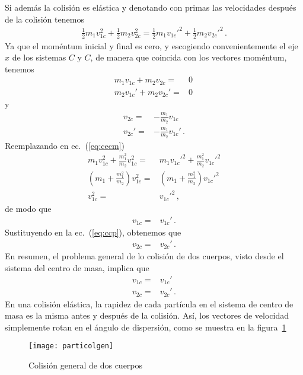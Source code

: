 Si además la colisión es elástica y denotando con primas las
velocidades después de la colisión tenemos
\begin{align}
\label{eq:cecm}
  \tfrac{1}{2}m_1 v_{1c}^2+  \tfrac{1}{2}m_2 v_{2c}^2
= \tfrac{1}{2}m_1 {v_{1c}'}^2+ \tfrac{1}{2}m_2 {v_{2c}'}^2\,.
\end{align}
Ya que el moméntum inicial y final es cero, y escogiendo
convenientemente el eje $x$ de los sistemas $C$ y $C$, de manera que
coincida con los vectores moméntum, tenemos
\begin{align}
  m_1 v_{1c}+m_2 v_{2c}=&0 \nonumber\\
  m_2 v_{1c}'+m_2 v_{2c}'=&0\,
\end{align}
y
\begin{align}
\label{eq:ccp}
  v_{2c}=&-\frac{m_1}{m_2}v_{1c}\nonumber\\
  v_{2c}'=&-\frac{m_1}{m_2}v_{1c}'\,.
\end{align}
Reemplazando en ec.~(\ref{eq:cecm})
\begin{align}
  m_1 v_{1c}^2+  \frac{m_1^2}{m_2} v_{1c}^2
=& m_1 {v_{1c}'}^2+ \frac{m_1^2}{m_2} {v_{1c}'}^2 \nonumber\\
 \left(m_1+\frac{m_1^2}{m_2}  \right) v_{1c}^2
=&\left(m_1+\frac{m_1^2}{m_2}  \right) {v_{1c}'}^2 \nonumber\\
v_{1c}^2=&{v_{1c}'}^2\,,
\end{align}
de modo que
\begin{align*}
  v_{1c}=&v_{1c}'\,.
\end{align*}
Sustituyendo en la ec.~(\ref{eq:ccp}), obtenemos que
\begin{align*}
  v_{2c}=&v_{2c}'\,.
\end{align*}
En resumen, el problema general de lo colisión de dos cuerpos, visto
desde el sistema del centro de masa, implica que
\begin{align}
  v_{1c}=&v_{1c}'\nonumber\\
  v_{2c}=&v_{2c}'\,.
\end{align}
En una colisión elástica, la rapidez de cada partícula en el sistema
de centro de masa es la misma antes y después de la colisión. Así, los
vectores de velocidad simplemente rotan en el ángulo de dispersión,
como se muestra en la figura~\ref{fig:particolgen}
\begin{figure}
  \centering
  \texttt{[image: particolgen]}
  \caption{Colisión general de dos cuerpos}
  \label{fig:particolgen}
\end{figure}


